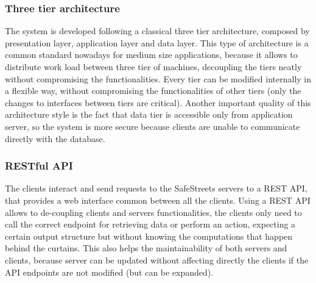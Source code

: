 \subsubsection{Three tier architecture}
The system is developed following a classical three tier architecture, composed by presentation layer, application layer and data layer. This type of architecture is a common standard nowadays for medium size applications, because it allows to distribute work load between three tier of machines, decoupling the tiers neatly without compromising the functionalities. Every tier can be modified internally in a flexible way, without compromising the functionalities of other tiers (only the changes to interfaces between tiers are critical). Another important quality of this architecture style is the fact that data tier is accessible only from application server, so the system is more secure because clients are unable to communicate directly with the database.

\subsubsection{RESTful API}

The clients interact and send requests to the SafeStreets servers to a REST API, that provides a web interface common between all the clients. Using a REST API allows to de-coupling clients and servers functionalities, the clients only need to call the correct endpoint for retrieving data or perform an action, expecting a certain output structure but without knowing the computations that happen behind the curtains. This also helps the maintainability of both servers and clients, because server can be updated without affecting directly the clients if the API endpoints are not modified (but can be expanded).

